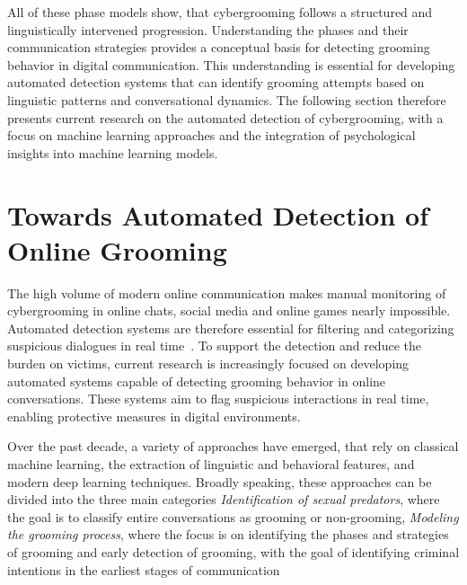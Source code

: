 All of these phase models show, that cybergrooming follows a structured and linguistically intervened progression. Understanding the phases and their communication strategies provides a conceptual basis for detecting grooming behavior in digital communication. This understanding is essential for developing automated detection systems that can identify grooming attempts based on linguistic patterns and conversational dynamics. The following section therefore presents current research on the automated detection of cybergrooming, with a focus on machine learning approaches and the integration of psychological insights into machine learning models.

\section{Towards Automated Detection of Online Grooming}

The high volume of modern online communication makes manual monitoring of cybergrooming in online chats, social media and online games nearly impossible. Automated detection systems are therefore essential for filtering and categorizing suspicious dialogues in real time~\cite{hamm2025llms}.
To support the detection and reduce the burden on victims, current research is increasingly focused on developing automated systems capable of detecting grooming behavior in online conversations. These systems aim to flag suspicious interactions in real time, enabling protective measures in digital environments.

Over the past decade, a variety of approaches have emerged, that rely on classical machine learning, the extraction of linguistic and behavioral features, and modern deep learning techniques. Broadly speaking, these approaches can be divided into the three main categories \textit{Identification of sexual predators}, where the goal is to classify entire conversations as grooming or non-grooming, \textit{Modeling the grooming process}, where the focus is on identifying the phases and strategies of grooming and early detection of grooming, with the goal of identifying criminal intentions in the earliest stages of communication

